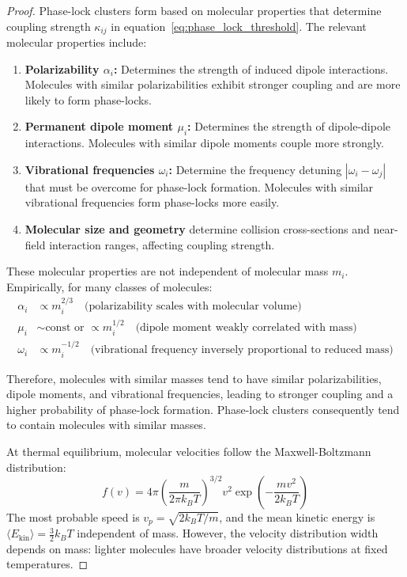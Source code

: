 \documentclass[12pt,a4paper]{article}
\theoremstyle{definition}
\theoremstyle{remark}
\begin{document}
\begin{proof}
Phase-lock clusters form based on molecular properties that determine coupling strength $\kappa_{ij}$ in equation~\eqref{eq:phase_lock_threshold}. The relevant molecular properties include:

\begin{enumerate}
    \item \textbf{Polarizability $\alpha_i$:} Determines the strength of induced dipole interactions. Molecules with similar polarizabilities exhibit stronger coupling and are more likely to form phase-locks.

    \item \textbf{Permanent dipole moment $\mu_i$:} Determines the strength of dipole-dipole interactions. Molecules with similar dipole moments couple more strongly.

    \item \textbf{Vibrational frequencies $\omega_i$:} Determine the frequency detuning $|\omega_i - \omega_j|$ that must be overcome for phase-lock formation. Molecules with similar vibrational frequencies form phase-locks more easily.

    \item \textbf{Molecular size and geometry} determine collision cross-sections and near-field interaction ranges, affecting coupling strength.
\end{enumerate}

These molecular properties are not independent of molecular mass $m_i$. Empirically, for many classes of molecules:
\begin{align}
\alpha_i &\propto m_i^{2/3} \quad \text{(polarizability scales with molecular volume)} \\
\mu_i &\sim \text{const} \text{ or } \propto m_i^{1/2} \quad \text{(dipole moment weakly correlated with mass)} \\
\omega_i &\propto m_i^{-1/2} \quad \text{(vibrational frequency inversely proportional to reduced mass)}
\end{align}

Therefore, molecules with similar masses tend to have similar polarizabilities, dipole moments, and vibrational frequencies, leading to stronger coupling and a higher probability of phase-lock formation. Phase-lock clusters consequently tend to contain molecules with similar masses.

At thermal equilibrium, molecular velocities follow the Maxwell-Boltzmann distribution:
\begin{equation}
f(v) = 4\pi \left(\frac{m}{2\pi k_B T}\right)^{3/2} v^2 \exp\left(-\frac{mv^2}{2k_B T}\right)
\end{equation}
The most probable speed is $v_p = \sqrt{2k_B T/m}$, and the mean kinetic energy is $\langle E_{\text{kin}} \rangle = \frac{3}{2} k_B T$ independent of mass. However, the velocity distribution width depends on mass: lighter molecules have broader velocity distributions at fixed temperatures.


\end{proof}
\end{document}

